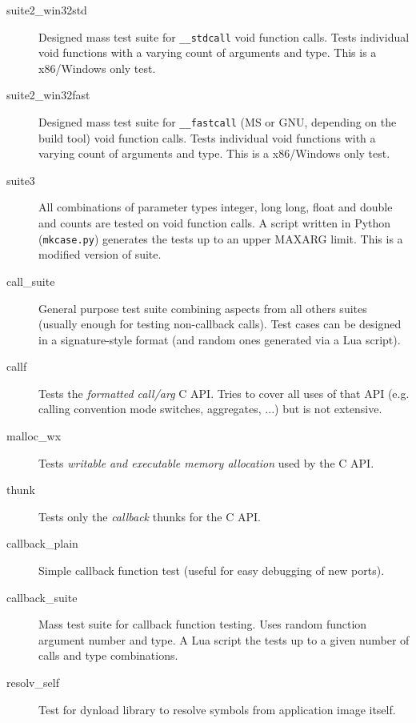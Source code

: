 \begin{description}
\item [suite2\_win32std]
Designed mass test suite for {\tt \_\_stdcall} void function calls.
Tests individual void functions with a varying count of arguments and type.
This is a x86/Windows only test.

\item [suite2\_win32fast]
Designed mass test suite for {\tt \_\_fastcall} (MS or GNU, depending on the build tool) void function calls.
Tests individual void functions with a varying count of arguments and type.
This is a x86/Windows only test.

\item [suite3]
All combinations of parameter types integer, long long, float and double and
counts are tested on void function calls.
A script written in Python ({\tt mkcase.py}) generates the tests up to
an upper MAXARG limit.
This is a modified version of suite.

\item [call\_suite]
General purpose test suite combining aspects from all others suites (usually enough for
testing non-callback calls).
Test cases can be designed in a signature-style format (and random ones generated
via a Lua script).

\item [callf]
Tests the \emph{formatted call/arg}  C API. Tries to cover all uses of
that API (e.g. calling convention mode switches, aggregates, ...) but is not extensive.

\item [malloc\_wx]
Tests \emph{writable and executable memory allocation} used by the
 C API.

\item [thunk]
Tests only the \emph{callback} thunks for the  C API.

\item [callback\_plain]
Simple callback function test (useful for easy debugging of new ports).

\item [callback\_suite]
Mass test suite for callback function testing. Uses random function argument
number and type.
A Lua script the tests up to a given number of calls and type combinations.

\item [resolv\_self]
Test for dynload library to resolve symbols from application image itself.

\end{description}

